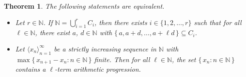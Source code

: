 \documentclass[12pt]{article}
\theoremstyle{plain}
\newtheorem{thm}{Theorem}[section]
\theoremstyle{definition}
\newcommand{\la}{\langle}
\newcommand{\ra}{\rangle}
\newcommand{\bbN}{\mathbb{N}}
\begin{document}
\begin{thm}
  \label{thm:vdwEqSyn}
  The following statements are equivalent.
  \begin{itemize}
    \item[(a)] Let $r \in \bbN$.
      If $\bbN = \bigcup_{i=1}^r C_i$, then there exists $i \in \{1, 2,
      \ldots, r\}$ such that for all $\ell \in \bbN$, there exist $a$,
      $d \in \bbN$ with $\{\, a, a+d, \ldots, a+\ell d \,\} \subseteq
      C_i$. 

    \item[(b)] Let $\la x_n \ra_{n=1}^\infty$ be a strictly increasing
      sequence in $\bbN$ with $\max\{\, x_{n+1} - x_n : n \in \bbN
      \,\}$ finite.
      Then for all $\ell \in \bbN$, the set $\{\, x_n : n \in \bbN
      \,\}$ contains a \mbox{$\ell$-term} arithmetic progression.
  \end{itemize}
\end{thm}
\end{document}
